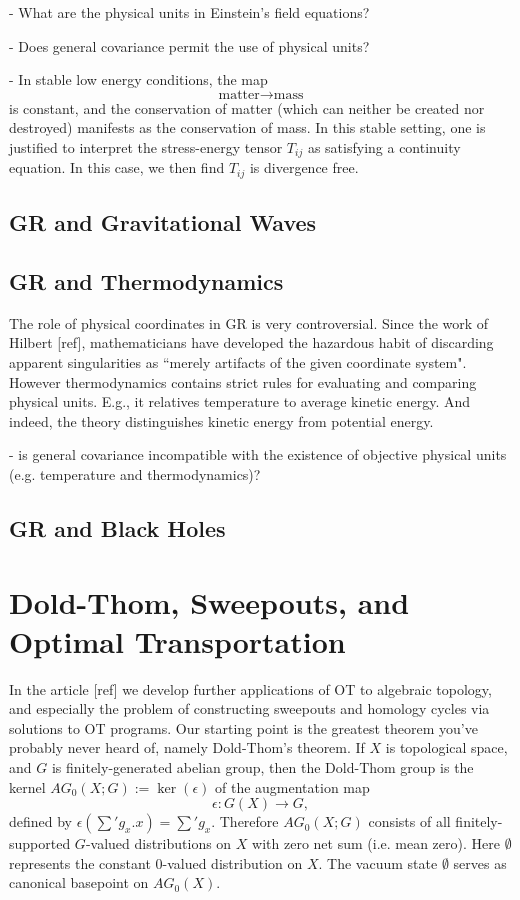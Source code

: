 \documentclass[12pt]{amsart}
\theoremstyle{definition}
\theoremstyle{remark}
\begin{document}
- What are the physical units in Einstein's field equations?

- Does general covariance permit the use of physical units?

- In stable low energy conditions, the map $$\text{matter} \to \text{mass}$$ is constant, and the conservation of matter (which can neither be created nor destroyed) manifests as the conservation of mass. In this stable setting, one is justified to interpret the stress-energy tensor $T_{ij}$ as satisfying a continuity equation. In this case, we then find $T_{ij}$ is divergence free.

\subsection{GR and Gravitational Waves}

\subsection{GR and Thermodynamics}

The role of physical coordinates in GR is very controversial. Since the work of Hilbert [ref], mathematicians have developed the hazardous habit of discarding apparent singularities as ``merely artifacts of the given coordinate system". However thermodynamics contains strict rules for evaluating and comparing physical units. E.g., it relatives temperature to average kinetic energy. And indeed, the theory distinguishes kinetic energy from potential energy.

- is general covariance incompatible with the existence of objective physical units (e.g. temperature and thermodynamics)?


\subsection{GR and Black Holes}



\section{Dold-Thom, Sweepouts, and Optimal Transportation}
In the article [ref] we develop further applications of OT to algebraic topology, and especially the problem of constructing sweepouts and homology cycles via solutions to OT programs. Our starting point is the greatest theorem you've probably never heard of, namely Dold-Thom's theorem. If $X$ is topological space, and $G$ is finitely-generated abelian group, then the Dold-Thom group is the kernel $AG_0(X;G):=\ker(\epsilon)$ of the augmentation map $$\epsilon: G(X) \to G,$$ defined by $\epsilon(\sum' g_x .x)=\sum' g_x$. Therefore $AG_0(X;G)$ consists of all finitely-supported $G$-valued distributions on $X$ with zero net sum (i.e. mean zero). Here $\emptyset$ represents the constant $0$-valued distribution on $X$. The vacuum state $\emptyset$ serves as canonical basepoint on $AG_0(X)$.
\end{document}
